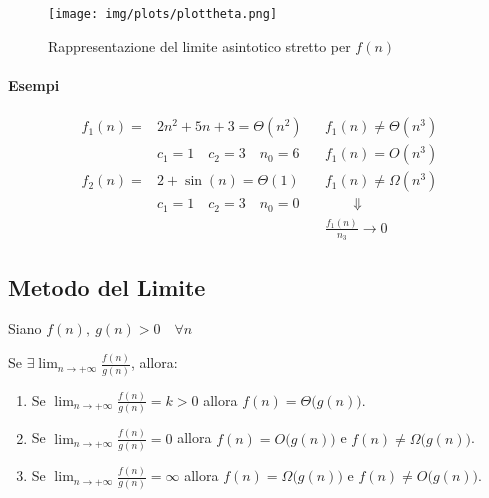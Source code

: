 \begin{figure}[!htb]
	\centering
	\texttt{[image: img/plots/plottheta.png]}
	\caption{Rappresentazione del limite asintotico stretto per $f(n)$}
\end{figure}

\paragraph{Esempi}
\begin{align*}
	f_1(n) = & 2n^2 + 5n + 3 = \Theta (n^2) && f_1(n) \neq \Theta (n^3) \\
	& c_1 = 1 \quad c_2 = 3 \quad n_0 = 6 && f_1(n) = O(n^3) \\
	f_2(n) = & 2 + \sin (n) = \Theta (1) && f_1(n) \neq \Omega (n^3) \\
	& c_1 = 1 \quad c_2 = 3 \quad n_0 = 0 && \qquad \Downarrow \\
	& && \frac{f_1(n)}{n_3} \rightarrow 0
\end{align*}
\newpage
\subsection{Metodo del Limite}
Siano $f(n),\ g(n) > 0 \quad \forall n$ \par \medskip
Se $\exists \lim_{n \to +\infty} \frac{f(n)}{g(n)}$, allora:

\begin{enumerate}
	\item Se $\lim_{n \to +\infty} \frac{f(n)}{g(n)} = k > 0$ allora $f(n) = \Theta \big( g(n) \big)$.
	
	\item Se $\lim_{n \to +\infty} \frac{f(n)}{g(n)} = 0$ allora $f(n) = O \big( g(n) \big)$ e 
	$f(n) \neq \Omega \big( g(n) \big)$.
	
	\item Se $\lim_{n \to +\infty} \frac{f(n)}{g(n)} = \infty$ allora $f(n) = \Omega \big( g(n) \big)$ e 
	$f(n) \neq O \big( g(n) \big)$.
\end{enumerate}


